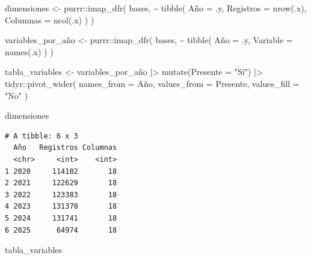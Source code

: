 \documentclass[
  letterpaper,
  DIV=11,
  numbers=noendperiod]{scrartcl}
\newenvironment{Shaded}{\begin{snugshade}}{\end{snugshade}}
\newcommand{\AttributeTok}[1]{\textcolor[rgb]{0.40,0.45,0.13}{#1}}
\newcommand{\FunctionTok}[1]{\textcolor[rgb]{0.28,0.35,0.67}{#1}}
\newcommand{\NormalTok}[1]{\textcolor[rgb]{0.00,0.23,0.31}{#1}}
\newcommand{\OtherTok}[1]{\textcolor[rgb]{0.00,0.23,0.31}{#1}}
\newcommand{\SpecialCharTok}[1]{\textcolor[rgb]{0.37,0.37,0.37}{#1}}
\newcommand{\StringTok}[1]{\textcolor[rgb]{0.13,0.47,0.30}{#1}}
\begin{document}
\begin{Shaded}
\begin{Highlighting}[]
\NormalTok{dimensiones }\OtherTok{\textless{}{-}}\NormalTok{ purrr}\SpecialCharTok{::}\FunctionTok{imap\_dfr}\NormalTok{(}
\NormalTok{  bases,}
  \SpecialCharTok{\textasciitilde{}} \FunctionTok{tibble}\NormalTok{(}
\NormalTok{    Año }\OtherTok{=}\NormalTok{ .y,}
    \AttributeTok{Registros =} \FunctionTok{nrow}\NormalTok{(.x),}
    \AttributeTok{Columnas =} \FunctionTok{ncol}\NormalTok{(.x)}
\NormalTok{  )}
\NormalTok{)}

\NormalTok{variables\_por\_año }\OtherTok{\textless{}{-}}\NormalTok{ purrr}\SpecialCharTok{::}\FunctionTok{imap\_dfr}\NormalTok{(}
\NormalTok{  bases,}
  \SpecialCharTok{\textasciitilde{}} \FunctionTok{tibble}\NormalTok{(}
\NormalTok{    Año }\OtherTok{=}\NormalTok{ .y,}
    \AttributeTok{Variable =} \FunctionTok{names}\NormalTok{(.x)}
\NormalTok{  )}
\NormalTok{)}

\NormalTok{tabla\_variables }\OtherTok{\textless{}{-}}\NormalTok{ variables\_por\_año }\SpecialCharTok{|\textgreater{}}
  \FunctionTok{mutate}\NormalTok{(}\AttributeTok{Presente =} \StringTok{"Sí"}\NormalTok{) }\SpecialCharTok{|\textgreater{}}
\NormalTok{  tidyr}\SpecialCharTok{::}\FunctionTok{pivot\_wider}\NormalTok{(}
    \AttributeTok{names\_from =}\NormalTok{ Año,}
    \AttributeTok{values\_from =}\NormalTok{ Presente,}
    \AttributeTok{values\_fill =} \StringTok{"No"}
\NormalTok{  )}

\NormalTok{dimensiones}
\end{Highlighting}
\end{Shaded}

\begin{verbatim}
# A tibble: 6 x 3
  Año   Registros Columnas
  <chr>     <int>    <int>
1 2020     114102       18
2 2021     122629       18
3 2022     123383       18
4 2023     131370       18
5 2024     131741       18
6 2025      64974       18
\end{verbatim}

\begin{Shaded}
\begin{Highlighting}[]
\NormalTok{tabla\_variables}
\end{Highlighting}
\end{Shaded}
\end{document}
